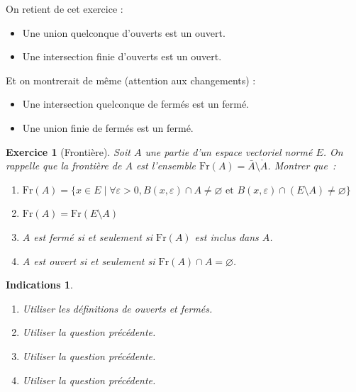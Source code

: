 \documentclass[11pt,a4paper]{article}
\renewcommand{\epsilon}{\varepsilon}
\theoremstyle{exostyle}
\newtheorem{exo}{Exercice}
\newtheorem{ind}{Indications}
\newcommand{\exercice}[1]{} \newcommand{\finexercice}{}
\newcommand{\enonce}{\begin{exo}} \newcommand{\finenonce}{\end{exo}}
\newcommand{\indication}{\begin{ind}} \newcommand{\finindication}{\end{ind}}
\begin{document}
\medskip

On retient de cet exercice : 
\begin{itemize}
	\item Une union quelconque d'ouverts est un ouvert.
	\item Une intersection finie d'ouverts est un ouvert.
\end{itemize}

Et on montrerait de même (attention aux changements) :
\begin{itemize}
	\item Une intersection quelconque de fermés est un fermé.
	\item Une union finie de fermés est un fermé.
\end{itemize}	
\fincorrection
\finexercice


\exercice{1757, maillot, 2001/09/01}

\enonce[Frontière]
Soit $A$ une partie d'un espace vectoriel normé $E$. On
rappelle que la \emph{frontière} de $A$ est l'ensemble $\mathrm{Fr}(A)=\bar A \setminus \mathring{A}$. Montrer que~:
\begin{enumerate}
	\item $ \mathrm{Fr}(A)=\{x\in E \mid \forall \epsilon>0, B(x,\epsilon)\cap A
	\neq\varnothing \text{\ et\ } B(x,\epsilon)\cap (E \setminus A)\neq\varnothing\}$
	\item $\mathrm{Fr}(A)=\mathrm{Fr}(E \setminus A)$
	\item $A$ est fermé si et seulement si $\mathrm{Fr}(A)$ est inclus dans $A$.
	\item $A$ est ouvert si et seulement si $\mathrm{Fr}(A)\cap A=\varnothing$.
\end{enumerate}
\finenonce

\indication
\begin{enumerate}
	\item Utiliser les définitions de ouverts et fermés.
	\item Utiliser la question précédente.
	\item Utiliser la question précédente.
	\item Utiliser la question précédente.
\end{enumerate}
\finindication
\end{document}
